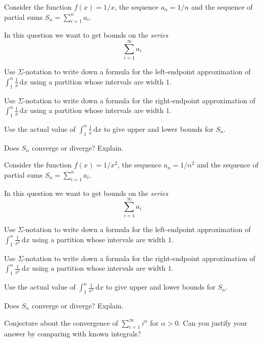 \documentclass{workbook}
\begin{document}
\begin{slide}
	\question
	Consider the function $f(x)=1/x$, the sequence $a_n=1/n$ and 
	the sequence of partial sums $\displaystyle S_n = \sum_{i=1}^n a_i$.

	In this question we want to get bounds on the \emph{series}
	\[
		\sum_{i=1}^\infty a_i
	\]
	\begin{parts}
		\item Use $\Sigma$-notation to write down a formula for the left-endpoint approximation of
		$\displaystyle \int_1^n \frac{1}{x}\,\mathrm d x$ using a partition
		whose intervals are width $1$.

		\bigskip
		\bigskip
		\bigskip
		\item Use $\Sigma$-notation to write down a formula for the right-endpoint approximation of
		$\displaystyle \int_1^n \frac{1}{x}\,\mathrm d x$ using a partition
		whose intervals are width $1$.
		\item Use the actual value of $\displaystyle \int_1^n \frac{1}{x}\,\mathrm d x$ to give upper and lower bounds for $S_n$.
		\item Does $S_n$ converge or diverge? Explain.
	\end{parts}
\end{slide}

\begin{slide}
	\question
	Consider the function $f(x)=1/x^2$, the sequence $a_n=1/n^2$ and 
	the sequence of partial sums $\displaystyle S_n = \sum_{i=1}^n a_i$.

	In this question we want to get bounds on the \emph{series}
	\[
		\sum_{i=1}^\infty a_i
	\]
	\begin{parts}
		\item Use $\Sigma$-notation to write down a formula for the left-endpoint approximation of
		$\displaystyle \int_1^n \frac{1}{x^2}\,\mathrm d x$ using a partition
		whose intervals are width $1$.
		
		\bigskip
		\bigskip
		\bigskip
		\item Use $\Sigma$-notation to write down a formula for the right-endpoint approximation of
		$\displaystyle \int_1^n \frac{1}{x^2}\,\mathrm d x$ using a partition
		whose intervals are width $1$.
		\item Use the actual value of $\displaystyle \int_1^n \frac{1}{x^2}\,\mathrm d x$ to give upper and lower bounds for $S_n$.
		\item Does $S_n$ converge or diverge? Explain.
		\item Conjecture about the convergence of $\displaystyle \sum_{i=1}^\infty i^{\alpha}$ for $\alpha> 0$. Can you justify your answer by comparing with known integrals?
	\end{parts}
\end{slide}
\end{document}
